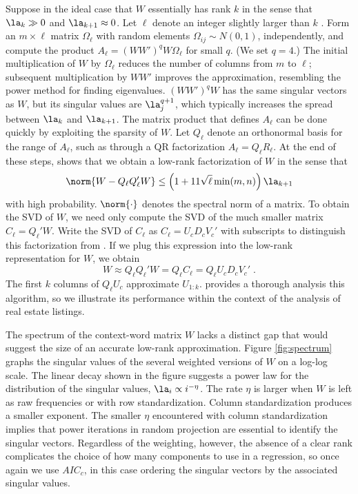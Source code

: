 \documentclass[12pt]{article}
\begin{document}
 
 Suppose in the ideal case that $W$ essentially has rank $k$ in the sense that
 $\la_k \gg 0$ and $\la_{k+1} \approx 0$.  Let $\ell$ denote an integer slightly
 larger than $k$ \citep[see][for the details]{tropp10}.  Form an $m \times \ell$
 matrix $\Omega_{\ell}$ with random elements $\Omega_{ij} \sim N(0,1)$,
 independently, and compute the product $A_{\ell} = (W W')^q W \Omega_{\ell}$
 for small $q$.  (We set $q = 4$.)  The initial multiplication of $W$ by
 $\Omega_\ell$ reduces the number of columns from $m$ to $\ell$; subsequent
 multiplication by $W W'$ improves the approximation, resembling the power
 method for finding eigenvalues. $(W W')^q W$ has the same singular vectors as
 $W$, but its singular values are $\la_j^{q+1}$, which typically increases the
 spread between $\la_k$ and $\la_{k+1}$.  The matrix product that defines
 $A_\ell$ can be done quickly by exploiting the sparsity of $W$.  Let $Q_{\ell}$
 denote an orthonormal basis for the range of $A_{\ell}$, such as through a QR
 factorization $A_\ell = Q_\ell R_\ell$.  At the end of these steps,
 \citet{tropp10} shows that we obtain a low-rank factorization of $W$ in the
 sense that
 \begin{equation}
   \norm{W - Q_{\ell} Q_\ell' W} \le  \left(1+11 \sqrt{\ell} \min(m,n)\right) \la_{k+1}
 \label{tropp}
 \end{equation}
 with high probability.  $\norm{\cdot}$ denotes the spectral norm of a matrix.
  To obtain the SVD of $W$, we need only compute the SVD of the much smaller
 matrix $C_\ell = Q_\ell'W$.  Write the SVD of $C_\ell$ as $C_\ell = U_c D_c
 V_c'$ with subscripts to distinguish this factorization from .  If we
 plug this expression into the low-rank representation for $W$, we obtain
\begin{equation*}
     W \approx Q_{\ell} Q_\ell' W = Q_\ell C_\ell = Q_\ell U_c D_c V_c' \;.
\end{equation*}
The first $k$ columns of $Q_\ell U_c$ approximate  $U_{1:k}$. \citet{tropp10}
 provides a thorough analysis this algorithm, so we
 illustrate its performance within the context of the analysis of real estate listings.


 The spectrum of the context-word matrix $W$ lacks a distinct gap that would
 suggest the size of an accurate low-rank approximation.  Figure
 \ref{fig:spectrum} graphs the singular values of the several weighted versions
 of $W$ on a log-log scale.   The linear decay shown in the figure suggests
 a power law for the distribution of the singular values, $\la_i \propto i^{-\eta}$.  The rate
 $\eta$ is larger when $W$ is left as raw frequencies or with
 row standardization.  Column standardization produces a smaller
 exponent.  The smaller $\eta$ encountered with column standardization implies
 that power iterations in  random projection are essential to
 identify the singular vectors. Regardless of the weighting, however, the absence of a clear
 rank complicates the choice of how many components to use in a regression, so
 once again we use $AIC_c$, in this case ordering the singular vectors by the 
 associated singular values.
 
\end{document}
